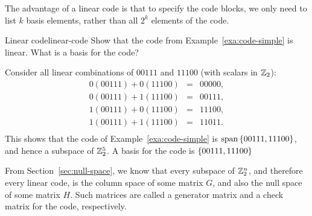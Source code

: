 The advantage of a linear code is that to specify the code blocks, we
only need to list $k$ basis elements, rather than all $2^k$ elements
of the code.

\begin{example}{Linear code}{linear-code}
  Show that the code from Example~\ref{exa:code-simple} is
  linear. What is a basis for the code?
\end{example}

\begin{solution}
  Consider all linear combinations of $00111$ and $11100$ (with
  scalars in $\mathbb{Z}_2$):
  \begin{equation*}
    \begin{array}{rcl}
      0(00111) + 0(11100) &=& 00000, \\
      0(00111) + 1(11100) &=& 00111, \\
      1(00111) + 0(11100) &=& 11100, \\
      1(00111) + 1(11100) &=& 11011. \\
    \end{array}
  \end{equation*}
  This shows that the code of Example~\ref{exa:code-simple} is
  $\sspan\set{00111, 11100}$, and hence a subspace of $\mathbb{Z}_2^5$. A
  basis for the code is $\left\{00111, 11100\right\}$
\end{solution}

From Section~\ref{sec:null-space}, we know that every subspace of
$\mathbb{Z}_2^n$, and therefore every linear code, is the column space of some
matrix $G$, and also the null space of some matrix $H$. Such matrices
are called a generator matrix and a check matrix for the code,
respectively.

\begin{definition}{}{}
\end{definition}
